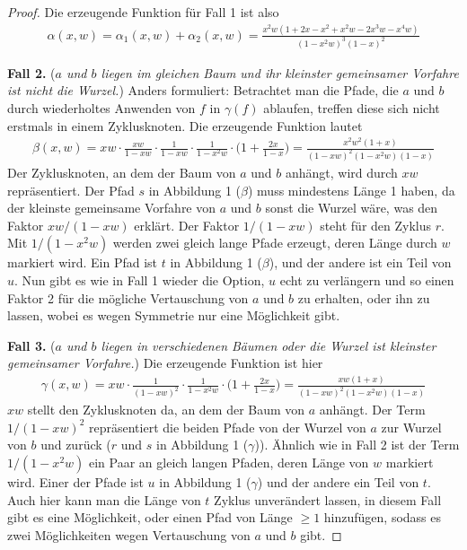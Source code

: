 \documentclass[a4paper, 10pt, ngerman]{article}
\begin{document}
\begin{proof}
    Die erzeugende Funktion für Fall 1 ist also
    \begin{align*}
        \alpha(x, w)
        = \alpha_1(x, w) + \alpha_2(x, w)
        = \frac {x^2w(1 + 2x - x^2 + x^2w - 2x^3w - x^4w)} {(1 - x^2w)^3(1 - x)^2}
    \end{align*}

    \textbf{Fall 2.} (\emph{$a$ und $b$ liegen im gleichen Baum und ihr kleinster gemeinsamer Vorfahre ist nicht die Wurzel.}) Anders formuliert: Betrachtet man die Pfade, die $a$ und $b$ durch wiederholtes Anwenden von $f$ in $\gamma(f)$ ablaufen, treffen diese sich nicht erstmals in einem Zyklusknoten. Die erzeugende Funktion lautet
    \begin{align*}
        \beta(x, w)
        = xw \cdot \frac {xw} {1 - xw} \cdot \frac {1} {1 - xw} \cdot \frac {1} {1 - x^2w} \cdot \Bigg (1 + \frac {2x} {1 - x} \Bigg )
        = \frac {x^2w^2(1 + x)} {(1 - xw)^2(1 - x^2w)(1 - x)}
    \end{align*}
    Der Zyklusknoten, an dem der Baum von $a$ und $b$ anhängt, wird durch $xw$ repräsentiert. Der Pfad $s$ in Abbildung 1 ($\beta$) muss mindestens Länge 1 haben, da der kleinste gemeinsame Vorfahre von $a$ und $b$ sonst die Wurzel wäre, was den Faktor $xw/(1 - xw)$ erklärt. Der Faktor $1/(1 - xw)$ steht für den Zyklus $r$. Mit $1/(1 - x^2w)$ werden zwei gleich lange Pfade erzeugt, deren Länge durch $w$ markiert wird. Ein Pfad ist $t$ in Abbildung 1 ($\beta$), und der andere ist ein Teil von $u$. Nun gibt es wie in Fall 1 wieder die Option, $u$ echt zu verlängern und so einen Faktor 2 für die mögliche Vertauschung von $a$ und $b$ zu erhalten, oder ihn zu lassen, wobei es wegen Symmetrie nur eine Möglichkeit gibt.

    \textbf{Fall 3.} (\emph{$a$ und $b$ liegen in verschiedenen Bäumen oder die Wurzel ist kleinster gemeinsamer Vorfahre.}) Die erzeugende Funktion ist hier
    \begin{align*}
        \gamma(x, w)
        = xw \cdot \frac {1} {(1 - xw)^2} \cdot \frac {1} {1 - x^2w} \cdot \Bigg (1 + \frac {2x}{1 - x} \Bigg )
        = \frac {xw(1 + x)} {(1 - xw)^2(1 - x^2w)(1 - x)}
    \end{align*}
    $xw$ stellt den Zyklusknoten da, an dem der Baum von $a$ anhängt. Der Term $1/(1 - xw)^2$ repräsentiert die beiden Pfade von der Wurzel von $a$ zur Wurzel von $b$ und zurück ($r$ und $s$ in Abbildung 1 ($\gamma$)). Ähnlich wie in Fall 2 ist der Term $1/(1 - x^2w)$ ein Paar an gleich langen Pfaden, deren Länge von $w$ markiert wird. Einer der Pfade ist $u$ in Abbildung 1 ($\gamma$) und der andere ein Teil von $t$. Auch hier kann man die Länge von $t$ Zyklus unverändert lassen, in diesem Fall gibt es eine Möglichkeit, oder einen Pfad von Länge $\ge 1$ hinzufügen, sodass es zwei Möglichkeiten wegen Vertauschung von $a$ und $b$ gibt.


\end{proof}
\end{document}
